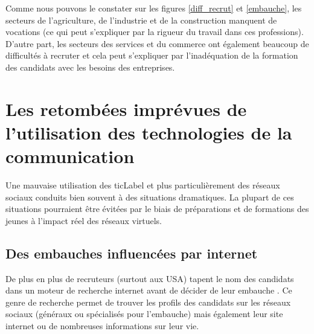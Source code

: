Comme nous pouvons le constater sur les figures \ref{diff_recrut} et \ref{embauche}, les secteurs de l'agriculture, de l'industrie et de la construction manquent de vocations (ce qui peut s'expliquer par la rigueur du travail dans ces professions). D'autre part, les secteurs des services et du commerce ont également beaucoup de difficultés à recruter et cela peut s'expliquer par l'inadéquation de la formation des candidats avec les besoins des entreprises.


\section{Les retombées imprévues de l'utilisation des technologies de la communication}
Une mauvaise utilisation des \gls{ticLabel} et plus particulièrement des réseaux sociaux conduits bien souvent à des situations dramatiques. La plupart de ces situations pourraient être évitées par le biais de préparations et de formations des jeunes à l'impact réel des réseaux virtuels.

\subsection{Des embauches influencées par internet}
De plus en plus de recruteurs (surtout aux USA) tapent le nom des candidats dans un moteur de recherche internet avant de décider de leur embauche \cite{recrutement_internet, recrut_social_network, social_recrut}. Ce genre de recherche permet de trouver les profils des candidats sur les réseaux sociaux (généraux ou spécialisés pour l'embauche) mais également leur site internet ou de nombreuses informations sur leur vie.

